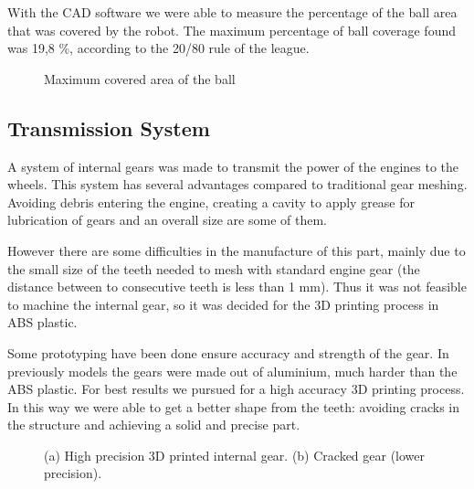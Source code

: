 With the CAD software we were able to measure the percentage of the ball area that was covered by the robot. The maximum percentage of ball coverage found was 19,8 \%, according to the 20/80 rule of the league. 

\begin{figure}[thpb]
	\centering
	\caption[]{Maximum covered area of the ball}
	\label{mec}
\end{figure}

\subsection{Transmission System}

A system of internal gears was made to transmit the power of the engines to the wheels. This system has several advantages compared to traditional gear meshing. Avoiding debris entering the engine, creating a cavity to apply grease for lubrication of gears and an overall size are some of them.

However there are some difficulties in the manufacture of this part, mainly due to the small size of the teeth needed to mesh with standard engine gear (the distance between to consecutive teeth is less than 1 mm). Thus it was not feasible to machine the internal gear, so it was decided for the 3D printing process in ABS plastic.

Some prototyping have been done ensure accuracy and strength of the gear. In previously models the gears were made out of aluminium, much harder than the ABS plastic. For best results we pursued for a high accuracy 3D printing process. In this way we were able to get a better shape from the teeth: avoiding cracks in the structure and achieving a solid and precise part.

\begin{figure}[thpb]
	\centering
	\caption{(a) High precision 3D printed internal gear. (b) Cracked gear (lower precision).}
	\label{mec}
\end{figure}

